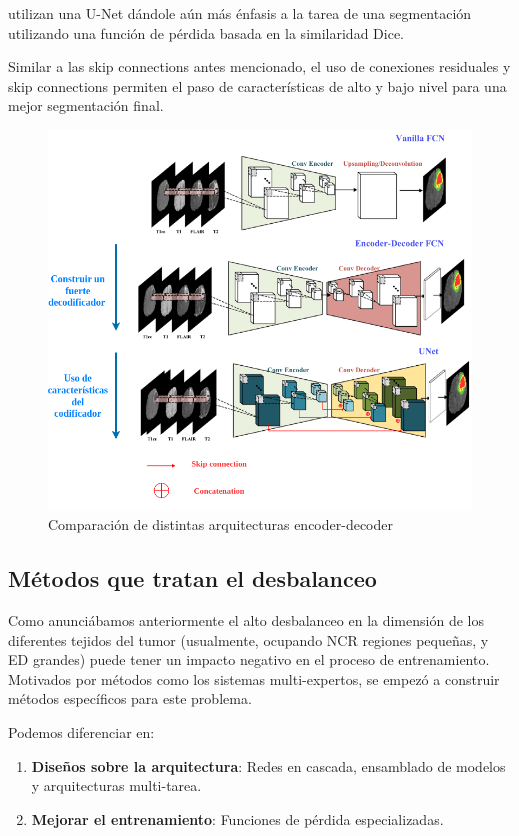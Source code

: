 \begin{enumerate}
				\cite{isensee2018brain} utilizan una U-Net dándole aún más énfasis a la tarea de una segmentación utilizando una función de pérdida basada en la similaridad Dice.
				
				Similar a las skip connections antes mencionado, el uso de conexiones residuales  y skip connections permiten el paso de características de alto y bajo nivel para una mejor segmentación final.
				
				\begin{figure}[H]
					\centering
					\includegraphics[width=0.85\linewidth]{imagenes/encoder-decoderIMG.drawio.png}
					\caption{Comparación de distintas arquitecturas encoder-decoder}
				\end{figure}
				
			\end{enumerate}
			
			
		\subsection{Métodos que tratan el desbalanceo}
		
		Como anunciábamos anteriormente el alto desbalanceo en la dimensión de los diferentes tejidos del tumor (usualmente, ocupando NCR regiones pequeñas, y ED grandes) puede tener un impacto negativo en el proceso de entrenamiento. Motivados por métodos como los sistemas multi-expertos, se empezó a construir métodos específicos para este problema.
		
		Podemos diferenciar en:
		\begin{enumerate}
			\item \textbf{Diseños sobre la arquitectura}: Redes en cascada, ensamblado de modelos y arquitecturas multi-tarea.
			\item \textbf{Mejorar el entrenamiento}: Funciones de pérdida especializadas.
		\end{enumerate}
		

